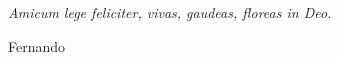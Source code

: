 \null
\vfill
\thispagestyle{empty}



{\normalsize \it \hfill Amicum lege feliciter, vivas, gaudeas, floreas in Deo. \vspace*{4pt}


\hfill Fernando \vspace*{4pt}}


